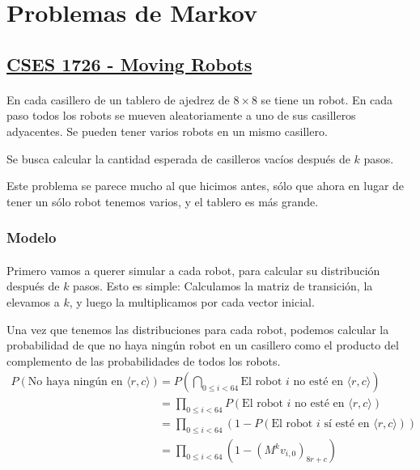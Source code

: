 \documentclass[../main.tex]{subfiles}
\begin{document}
\section{Problemas de Markov}

\subsection{\href{https://cses.fi/problemset/view/1726/}{CSES 1726 - Moving Robots}}

\paragraph{} En cada casillero de un tablero de ajedrez de \(8 \times 8\) se tiene un robot. En cada paso todos los robots se mueven aleatoriamente a uno de sus casilleros adyacentes. Se pueden tener varios robots en un mismo casillero.

Se busca calcular la cantidad esperada de casilleros vacíos después de \(k\) pasos.

Este problema se parece mucho al que hicimos antes, sólo que ahora en lugar de tener un sólo robot tenemos varios, y el tablero es más grande.

\subsubsection{Modelo}

\paragraph{} Primero vamos a querer simular a cada robot, para calcular su distribución después de \(k\) pasos.  Esto es simple: Calculamos la matriz de transición, la elevamos a \(k\), y luego la multiplicamos por cada vector inicial.

Una vez que tenemos las distribuciones para cada robot, podemos calcular la probabilidad de que no haya ningún robot en un casillero como el producto del complemento de las probabilidades de todos los robots. 
\begin{align*}
  P(\text{No haya ningún en } \langle r, c \rangle) &= P(\bigcap_{0 \leq i < 64} \text{El robot } i \text{ no esté en } \langle r, c \rangle) \\
                                                    &= \prod_{0 \leq i < 64}P(\text{El robot } i \text{ no esté en } \langle r, c \rangle) \\
                                                    &= \prod_{0 \leq i < 64}(1 - P(\text{El robot } i \text{ sí esté en } \langle r, c \rangle)) \\
                                                    &= \prod_{0 \leq i < 64}(1 - (M^{k}v_{i,0})_{8r + c}) \\
\end{align*}
\end{document}
